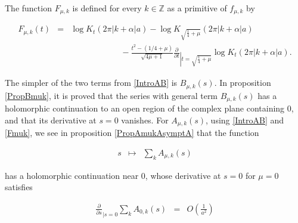 \documentclass{jams-l}
\theoremstyle{definition}
\theoremstyle{remark}
\numberwithin{equation}{section}
\begin{document}
                \noindent The function $F_{\mu,k}$ is defined for every $k \in \mathbb{Z}$ as a primitive of $f_{\mu,k}$ by
            
                \begin{equation}
                \label{Fmuk}
                    \begin{array}{lll}
                        F_{\mu,k} \left( t \right) & = & \log K_t \left( 2 \pi \left \vert k + \alpha \right \vert a \right) - \log K_{\sqrt{\frac{1}{4} + \mu}} \left( 2 \pi \left \vert k + \alpha \right \vert a \right) \\[1em]
                    
                        && \qquad \qquad \qquad - \frac{t^2 - \left( 1/4 + \mu \right)}{\sqrt{4 \mu + 1}} \frac{\partial}{\partial t}_{\left \vert t = \sqrt{\frac{1}{4} + \mu} \right.} \log K_t \left( 2 \pi \left \vert k + \alpha \right \vert a \right).
                    \end{array}
                \end{equation}
            
            
                \noindent The simpler of the two terms from \eqref{IntroAB} is $B_{\mu,k} \left( s \right)$. In proposition \ref{PropBmuk}, it is proved that the series with general term $B_{\mu,k} \left( s \right)$ has a holomorphic continuation to an open region of the complex plane containing $0$, and that its derivative at $s=0$ vanishes. For $A_{\mu,k} \left( s \right)$, using \eqref{IntroAB} and \eqref{Fmuk}, we see in proposition \ref{PropAmukAsymptA} that the function
                
                \[ \begin{array}{lll}
                        s & \longmapsto & \sum\limits_k A_{\mu,k} \left( s \right)
                    \end{array} \]
                
                \noindent has a holomorphic continuation near $0$, whose derivative at $s=0$ for $\mu=0$ satisfies
                
                \begin{equation}
                \label{AsymptAmukA}
                    \begin{array}{lll}
                        \frac{\partial}{\partial s}_{\left \vert s=0 \right.} \sum\limits_k A_{0,k} \left( s \right) & = & O \left( \frac{1}{a^2} \right)
                    \end{array}
                \end{equation}
                
\end{document}
